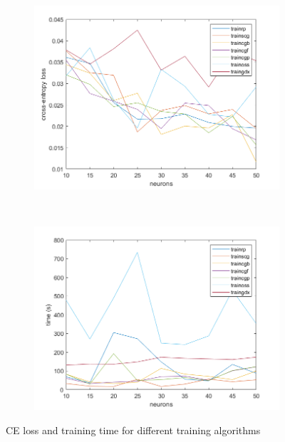 \documentclass[11pt,a4paper]{article}
\begin{document}
\begin{figure}[htb]
  \centering
  \begin{subfigure}[b]{0.45\textwidth}
    \centering
    \includegraphics[width=\textwidth]{figures/traininng_algo_comparison_CE.png}
  \end{subfigure}
  ~
  \begin{subfigure}[b]{0.45\textwidth}
    \centering
    \includegraphics[width=\textwidth]{figures/traininng_algo_comparison_time.png}
  \end{subfigure}
  \caption{CE loss and training time for different training algorithms}
  \label{fig:algoCompare}
\end{figure}
\end{document}
